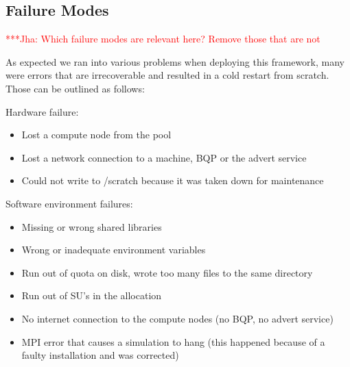 \documentclass[conference,final]{IEEEtran}
\newcommand{\jha}[0]{}
\newcommand{\jhanote}[1]{ {\textcolor{red} { ***Jha: #1 }}}
\begin{document}

\subsection{Failure Modes}

\jhanote{Which failure modes are relevant here? Remove those that are
  not}

As expected we ran into various problems when deploying this
framework, many were errors that are irrecoverable and resulted in a
cold restart from scratch. Those can be outlined as follows:

Hardware failure:
\begin{itemize}
\item{Lost a compute node from the pool}
\item{Lost a network connection to a machine, BQP or the advert service}
\item{Could not write to /scratch because it was taken down for maintenance}
\end{itemize}

Software environment failures:
\begin{itemize}
\item{Missing or wrong shared libraries}
\item{Wrong or inadequate environment variables}
\item{Run out of quota on disk, wrote too many files to the same directory}
\item{Run out of SU's in the allocation}
\item{No internet connection to the compute nodes (no BQP, no advert service)}
\item{MPI error that causes a simulation to hang (this happened because of a faulty installation and was corrected)}
\end{itemize}
\end{document}
